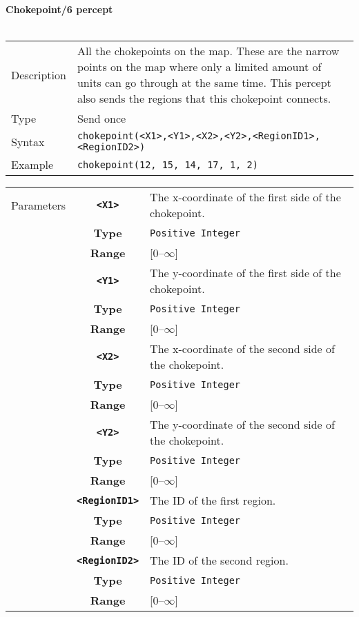 \noindent
\textbf{Chokepoint/6 percept}\\
\\
\begin{tabularx}{\textwidth}{lX}
 Description & All the chokepoints on the map. These are the narrow points on the map where only a limited amount of units can go through at the same time. This percept also sends the regions that this chokepoint connects.  \\
 Type & Send once \\
 Syntax & \verb|chokepoint(<X1>,<Y1>,<X2>,<Y2>,<RegionID1>,<RegionID2>)| \\
 Example & \verb|chokepoint(12, 15, 14, 17, 1, 2)| \\
 \end{tabularx}
 \begin{tabularx}{\textwidth}{l | c | p{8cm}|}
 \cline{2-3}
 Parameters & \textbf{\verb|<X1>|} & The x-coordinate of the first side of the chokepoint.\\
            & \textbf{Type} & \verb|Positive Integer| \\
            & \textbf{Range} & [0--$\infty$] \\
            \cline{2-3}
            & \textbf{\verb|<Y1>|} & The y-coordinate of the first side of the chokepoint.\\
            & \textbf{Type} & \verb|Positive Integer| \\
            & \textbf{Range} & [0--$\infty$] \\
            \cline{2-3}
            & \textbf{\verb|<X2>|} & The x-coordinate of the second side of the chokepoint.\\
            & \textbf{Type} & \verb|Positive Integer| \\
            & \textbf{Range} & [0--$\infty$] \\
            \cline{2-3}
            & \textbf{\verb|<Y2>|} & The y-coordinate of the second side of the chokepoint.\\
            & \textbf{Type} & \verb|Positive Integer| \\
            & \textbf{Range} & [0--$\infty$] \\
            \cline{2-3}
             & \textbf{\verb|<RegionID1>|} & The ID of the first region.\\
            & \textbf{Type} & \verb|Positive Integer| \\
            & \textbf{Range} & [0--$\infty$] \\
            \cline{2-3}
             & \textbf{\verb|<RegionID2>|} & The ID of the second region.\\
            & \textbf{Type} & \verb|Positive Integer| \\
            & \textbf{Range} & [0--$\infty$] \\
            \cline{2-3}
\end{tabularx}\\


